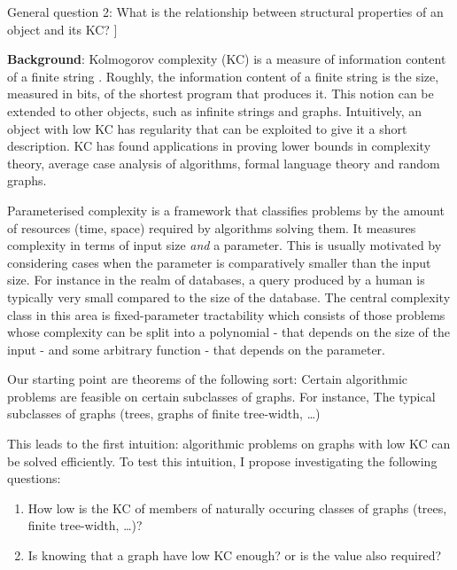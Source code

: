 \documentclass[11pt]{article}
\theoremstyle{plain} \numberwithin{equation}{section}
\theoremstyle{definition}
\begin{document}
General question 2: What is the relationship between structural properties of an object and its KC? ]

\noindent
{\bf Background}: Kolmogorov complexity (KC) is a measure of information content of a finite string \cite{Solo64, Kolm65, Chai69}. Roughly, the information content of a finite string is the size, measured in bits, of the shortest program that produces it. This notion can be extended to other objects, such as infinite strings and graphs. Intuitively, an object with low KC has regularity that can be exploited to give it a short description. KC has found applications in proving lower bounds in complexity theory, average case analysis of algorithms, formal language theory and random graphs.

Parameterised complexity \cite{DoFe99} is a framework that classifies problems by the amount of resources (time, space) required by algorithms solving them. It measures complexity in terms of input size {\it and} a parameter. This is usually motivated by considering cases when the parameter is comparatively smaller than the input size. For instance in the realm of databases, a query produced by a human is typically very small compared to the size of the database. The central complexity class in this area is fixed-parameter tractability which consists of those problems whose complexity can be split into a polynomial - that depends on the size of the input -  and some arbitrary function - that depends on the parameter.

Our starting point are theorems of the following sort: Certain algorithmic problems are feasible on certain subclasses of graphs. For instance, 
The typical subclasses of graphs (trees, graphs of finite tree-width, \ldots)

This leads to the first intuition: algorithmic problems on graphs with low KC can be solved efficiently. To test this intuition, I propose investigating the following questions:
\begin{enumerate}
    \item How low is the KC of members of naturally occuring classes of graphs (trees, finite tree-width, \ldots)?
    \item Is knowing that a graph have low KC enough? or is the value also required?
\end{enumerate}
    
\end{document}
